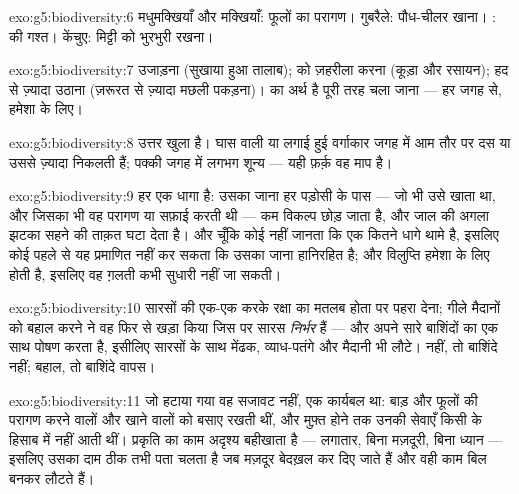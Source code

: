 \begin{solution}{exo:g5:biodiversity:6}
मधुमक्खियाँ और मक्खियाँ: फूलों का परागण। गुबरैले: पौध-चीलर खाना।
:  की गश्त। केंचुए: मिट्टी को भुरभुरी रखना।
\end{solution}

\begin{solution}{exo:g5:biodiversity:7}
 उजाड़ना (सुखाया हुआ तालाब);  को ज़हरीला करना (कूड़ा और
रसायन); हद से ज़्यादा उठाना (ज़रूरत से ज़्यादा मछली पकड़ना)।  का
अर्थ है पूरी तरह चला जाना --- हर जगह से, हमेशा के लिए।
\end{solution}

\begin{solution}{exo:g5:biodiversity:8}
उत्तर खुला है। घास वाली या लगाई हुई वर्गाकार जगह में आम तौर पर दस या
उससे ज़्यादा  निकलती हैं; पक्की जगह में लगभग शून्य --- यही
फ़र्क़ वह माप है।
\end{solution}

\begin{solution}{exo:g5:biodiversity:9}
हर  एक धागा है: उसका जाना हर पड़ोसी के पास --- जो भी उसे खाता
था, और जिसका भी वह परागण या सफ़ाई करती थी --- कम विकल्प छोड़ जाता है,
और जाल की अगला झटका सहने की ताक़त घटा देता है। और चूँकि कोई नहीं जानता
कि एक  कितने धागे थामे है, इसलिए कोई पहले से यह प्रमाणित नहीं
कर सकता कि उसका जाना हानिरहित है; और विलुप्ति हमेशा के लिए होती है,
इसलिए वह ग़लती कभी सुधारी नहीं जा सकती।
\end{solution}

\begin{solution}{exo:g5:biodiversity:10}
सारसों की एक-एक करके रक्षा का मतलब होता  पर पहरा देना; गीले
मैदानों को बहाल करने ने वह फिर से खड़ा किया जिस पर सारस
\emph{निर्भर} हैं --- और  अपने सारे बाशिंदों का एक साथ पोषण करता
है, इसीलिए सारसों के साथ मेंढक, व्याध-पतंगे और मैदानी  भी लौटे।
 नहीं, तो बाशिंदे नहीं;  बहाल, तो बाशिंदे वापस।
\end{solution}

\begin{solution}{exo:g5:biodiversity:11}
जो हटाया गया वह सजावट नहीं, एक कार्यबल था: बाड़ और फूलों की 
परागण करने वालों और  खाने वालों को बसाए रखती थीं, और मुफ़्त होने तक
उनकी सेवाएँ किसी के हिसाब में नहीं आती थीं। प्रकृति का काम अदृश्य
बहीखाता है --- लगातार, बिना मज़दूरी, बिना ध्यान --- इसलिए उसका दाम
ठीक तभी पता चलता है जब मज़दूर बेदख़ल कर दिए जाते हैं और वही काम बिल
बनकर लौटते हैं।
\end{solution}
